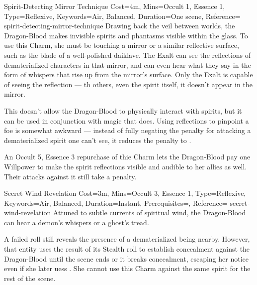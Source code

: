 \begin{Charm}{Spirit-Detecting Mirror Technique}{%
    Cost=4m,
    Mins={Occult 1, Essence 1},
    Type=Reflexive,
    Keywords={Air, Balanced},
    Duration=One scene,
    Reference=\cite*[p.~230]{db}
}{spirit-detecting-mirror-technique}
    Drawing back the veil between worlds, the Dragon-Blood makes invisible
    spirits and phantasms visible within the glass. To use this Charm, she must
    be touching a mirror or a similar reflective surface, such as the blade of
    a well-polished daiklave. The Exalt can see the reflections of
    dematerialized characters in that mirror, and can even hear what they say
    in the form of whispers that rise up from the mirror's surface. Only the
    Exalt is capable of seeing the reflection --- th others, even the spirit
    itself, it doesn't appear in the mirror.

    This doesn't allow the Dragon-Blood to physically interact with spirits,
    but it can be used in conjunction with magic that does. Using reflections
    to pinpoint a foe is somewhat awkward --- instead of fully negating the
     penalty for attacking a dematerialized spirit one can't see,
    it reduces the penalty to .

    \begin{Unavailable}
        An Occult 5, Essence 3 repurchase of thie Charm lets the Dragon-Blood
        pay one Willpower to make the spirit reflections visible and audible to
        her allies as well. Their attacks against it still take a 
        penalty.
    \end{Unavailable}
\end{Charm}


\begin{Charm}{Secret Wind Revelation}{%
    Cost=3m,
    Mins={Occult 3, Essence 1},
    Type=Reflexive,
    Keywords={Air, Balanced},
    Duration=Instant,
    Prerequisites=,
    Reference=\cite*[p.~231]{db}
}{secret-wind-revelation}
    Attuned to subtle currents of spiritual wind, the Dragon-Blood can hear a
    demon's whispers or a ghost's tread. 

    A failed roll still reveals the presence of a dematerialized being nearby.
    However, that entity uses the result of its Stealth roll to establish
    concealment against the Dragon-Blood until the scene ends or it breaks
    concealment, escaping her notice even if she later uess
    . She cannot use this
    Charm against the same spirit for the rest of the scene.
\end{Charm}



